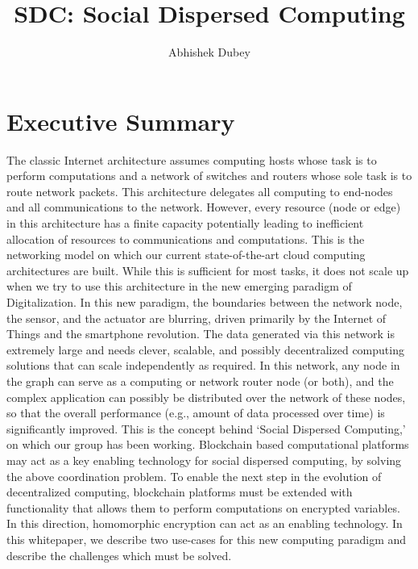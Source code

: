 \documentclass[12pt,letterpaper]{article}
\title{SDC: Social Dispersed Computing}
\author{Abhishek Dubey}
\date{}
\begin{document}
%

\maketitle

\section*{Executive Summary}

The classic Internet architecture assumes computing hosts whose task is to perform computations
and a network of switches and routers whose sole task is to route network packets. This architecture delegates all computing to end-nodes and all communications to the network. However, every resource (node or edge) in this architecture has a finite capacity potentially leading to inefficient allocation of resources to communications and computations.  This is the networking model on which our current state-of-the-art cloud computing architectures are built. While this is sufficient for most tasks, it does not scale up when we try to use this architecture in the new emerging paradigm of Digitalization. In this new paradigm, the boundaries between the network node, the sensor, and the actuator are blurring, driven primarily by the Internet of Things and the smartphone revolution. The data generated via this network is extremely large and needs clever, scalable, and possibly decentralized computing solutions that can scale independently as required. In this network, any node in the graph can serve as a computing or network
router node (or both), and  the complex application can possibly be distributed over the network
of these nodes, so that the overall performance (e.g., amount of data processed over
time) is significantly improved.  This is the concept behind `Social Dispersed Computing,' on which our group has been working. 
Blockchain based computational platforms may act as a key enabling technology for social dispersed computing, by solving the above coordination problem. 
To enable the next step in the evolution of decentralized computing, blockchain platforms must be extended with functionality that allows them to perform computations on encrypted variables.
In this direction, homomorphic encryption can act as an enabling technology. In this whitepaper, we describe two use-cases for this new computing paradigm and describe the challenges which must be solved.
\end{document}
